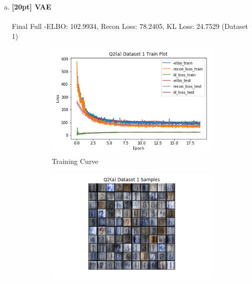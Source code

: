 \documentclass{article}
\begin{document}
\newpage
{}

\begin{enumerate}[(a)]
  \item {\bf [20pt] VAE} \\\\
  Final Full -ELBO: 102.9934, Recon Loss: 78.2405, KL Loss: 24.7529 (Dataset 1)
  \begin{figure}[H]
         \centering
         \begin{subfigure}[b]{0.475\textwidth}
             \centering
             \includegraphics[width=\textwidth]{figures/q2_a_dset1_train_plot.png}
             \caption{Training Curve}
         \end{subfigure}
         \hfill
         \begin{subfigure}[b]{0.475\textwidth}
             \centering
             \includegraphics[width=\textwidth]{figures/q2_a_dset1_samples.png}

\end{subfigure}
\end{figure}
\end{enumerate}
\end{document}
